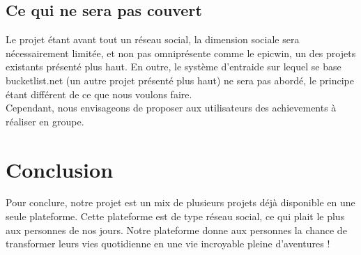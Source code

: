 \documentclass{life-fr}
\begin{document}
\section{Ce qui ne sera pas couvert}

Le projet étant avant tout un réseau social, la dimension sociale sera nécessairement limitée, et non pas omniprésente comme le epicwin, un des projets existants présenté plus haut. En outre, le système d’entraide sur lequel se base bucketlist.net (un autre projet présenté plus haut) ne sera pas abordé, le principe étant différent de ce que nous voulons faire.\\

Cependant, nous envisageons de proposer aux utilisateurs des achievements à réaliser en groupe.

\chapter{Conclusion}

Pour conclure, notre projet est un mix de plusieurs projets déjà disponible en une seule plateforme. Cette plateforme est de type réseau social, ce qui plait le plus aux personnes de nos jours.
Notre plateforme donne aux personnes la chance de transformer leurs vies quotidienne en une vie incroyable pleine d'aventures !
\end{document}
